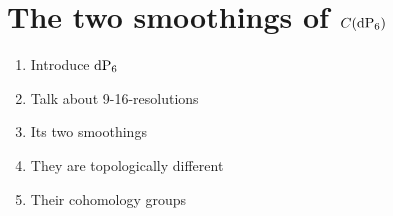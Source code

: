 \chapter{The two smoothings of \texorpdfstring{$C(\dP6)$}{C(DP6)}}
\label{sec:twosmoothings}

\begin{enumerate}
	\item Introduce $\dP6$
	\item Talk about 9-16-resolutions
	\item Its two smoothings
	\item They are topologically different
	\item Their cohomology groups
\end{enumerate}